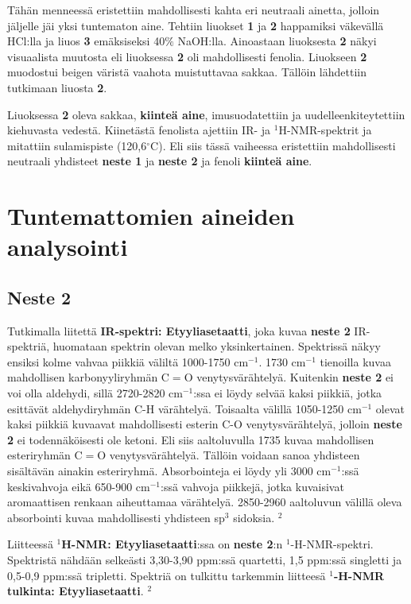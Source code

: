 \documentclass[11pt,a4paper]{article}
\begin{document}
Tähän menneessä eristettiin mahdollisesti kahta eri neutraali ainetta, jolloin jäljelle jäi yksi tuntematon aine. Tehtiin liuokset \textbf{1} ja \textbf{2} happamiksi väkevällä HCl:lla ja liuos \textbf{3} emäksiseksi 40$\%$ NaOH:lla. Ainoastaan liuoksesta \textbf{2} näkyi visuaalista muutosta eli liuoksessa \textbf{2} oli mahdollisesti fenolia. Liuokseen \textbf{2} muodostui beigen väristä vaahota muistuttavaa sakkaa. Tällöin lähdettiin tutkimaan liuosta \textbf{2}.

Liuoksessa \textbf{2} oleva sakkaa, \textbf{kiinteä aine}, imusuodatettiin ja uudelleenkiteytettiin kiehuvasta vedestä. Kiinetästä fenolista ajettiin IR- ja $^1$H-NMR-spektrit ja mitattiin sulamispiste (120,6$^\circ$C). Eli siis tässä vaiheessa eristettiin mahdollisesti neutraali yhdisteet \textbf{neste 1} ja \textbf{neste 2} ja fenoli \textbf{kiinteä aine}. 

\section{Tuntemattomien aineiden analysointi}


\subsection{Neste 2}

Tutkimalla liitettä \textbf{IR-spektri: Etyyliasetaatti}, joka kuvaa \textbf{neste 2} IR-spektriä, huomataan spektrin olevan melko yksinkertainen. Spektrissä näkyy ensiksi kolme vahvaa piikkiä väliltä 1000-1750 cm$^{-1}$. 1730 cm$^{-1}$ tienoilla kuvaa mahdollisen karbonyyliryhmän C$=$O venytysvärähtelyä. Kuitenkin \textbf{neste 2} ei voi olla aldehydi, sillä 2720-2820 cm$^{-1}$:ssa ei löydy selvää kaksi piikkiä, jotka esittävät aldehydiryhmän C-H värähtelyä. Toisaalta välillä 1050-1250 cm$^{-1}$ olevat kaksi piikkiä kuvaavat mahdollisesti esterin C-O venytysvärähtelyä, jolloin \textbf{neste 2} ei todennäköisesti ole ketoni. Eli siis aaltoluvulla 1735 kuvaa mahdollisen esteriryhmän C$=$O venytysvärähtelyä. Tällöin voidaan sanoa yhdisteen sisältävän ainakin esteriryhmä. Absorbointeja ei löydy yli 3000 cm$^{-1}$:ssä keskivahvoja eikä 650-900 cm$^{-1}$:ssä vahvoja piikkejä, jotka kuvaisivat aromaattisen renkaan aiheuttamaa värähtelyä. 2850-2960 aaltoluvun välillä oleva absorbointi kuvaa mahdollisesti yhdisteen sp$^3$ sidoksia. $^{2}$ 

Liitteessä \textbf{$^1$H-NMR: Etyyliasetaatti}:ssa on \textbf{neste 2}:n $^1$-H-NMR-spektri. Spektristä nähdään selkeästi 3,30-3,90 ppm:ssä quartetti, 1,5 ppm:ssä singletti ja 0,5-0,9 ppm:ssä tripletti. Spektriä on tulkittu tarkemmin liitteesä \textbf{$^1$-H-NMR tulkinta: Etyyliasetaatti}. $^2$
\end{document}
